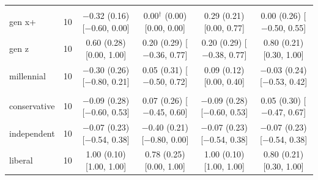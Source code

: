 \begin{table}[t]
\begin{tabular}{@{}lr*{4}{c}@{}}
\addlinespace
\multicolumn{6}{@{}l}{\textit{Age (D)}} \\
\quad gen x+ & 10 & \makecell{$-$0.32 (0.16)\\ {[}$-$0.60, 0.00{]}} & \makecell{0.00$^\dagger$ (0.00)\\ {[}0.00, 0.00{]}} & \makecell{0.29 (0.21)\\ {[}0.00, 0.77{]}} & \makecell{0.00 (0.26)\\ {[}$-$0.50, 0.55{]}} \\
\quad gen z & 10 & \makecell{0.60 (0.28)\\ {[}0.00, 1.00{]}} & \makecell{0.20 (0.29)\\ {[}$-$0.36, 0.77{]}} & \makecell{0.20 (0.29)\\ {[}$-$0.38, 0.77{]}} & \makecell{0.80 (0.21)\\ {[}0.30, 1.00{]}} \\
\quad millennial & 10 & \makecell{$-$0.30 (0.26)\\ {[}$-$0.80, 0.21{]}} & \makecell{0.05 (0.31)\\ {[}$-$0.50, 0.72{]}} & \makecell{0.09 (0.12)\\ {[}0.00, 0.40{]}} & \makecell{$-$0.03 (0.24)\\ {[}$-$0.53, 0.42{]}} \\
\addlinespace
\multicolumn{6}{@{}l}{\textit{Politics (N)}} \\
\quad conservative & 10 & \makecell{$-$0.09 (0.28)\\ {[}$-$0.60, 0.53{]}} & \makecell{0.07 (0.26)\\ {[}$-$0.45, 0.60{]}} & \makecell{$-$0.09 (0.28)\\ {[}$-$0.60, 0.53{]}} & \makecell{0.05 (0.30)\\ {[}$-$0.47, 0.67{]}} \\
\quad independent & 10 & \makecell{$-$0.07 (0.23)\\ {[}$-$0.54, 0.38{]}} & \makecell{$-$0.40 (0.21)\\ {[}$-$0.80, 0.00{]}} & \makecell{$-$0.07 (0.23)\\ {[}$-$0.54, 0.38{]}} & \makecell{$-$0.07 (0.23)\\ {[}$-$0.54, 0.38{]}} \\
\quad liberal & 10 & \makecell{1.00 (0.10)\\ {[}1.00, 1.00{]}} & \makecell{0.78 (0.25)\\ {[}0.00, 1.00{]}} & \makecell{1.00 (0.10)\\ {[}1.00, 1.00{]}} & \makecell{0.80 (0.21)\\ {[}0.30, 1.00{]}} \\

\end{tabular}
\end{table}
